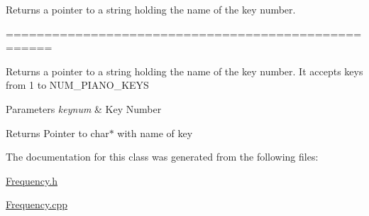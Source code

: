 Returns a pointer to a string holding the name of the key number. 

====================================================

Returns a pointer to a string holding the name of the key number. It accepts keys from 1 to N\+U\+M\+\_\+\+P\+I\+A\+N\+O\+\_\+\+K\+E\+Y\+S


\begin{DoxyParams}{Parameters}
{\em keynum} & Key Number\\
\hline
\end{DoxyParams}
\begin{DoxyReturn}{Returns}
Pointer to char$\ast$ with name of key 

 
\end{DoxyReturn}


The documentation for this class was generated from the following files\+:\begin{DoxyCompactItemize}
\item 
\hyperlink{_frequency_8h}{Frequency.\+h}\item 
\hyperlink{_frequency_8cpp}{Frequency.\+cpp}\end{DoxyCompactItemize}
